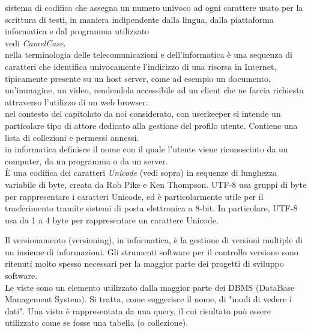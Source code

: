 \documentclass{scalatekids-article}
\begin{document}
    sistema di codifica che assegna un numero univoco ad ogni carattere usato per la scrittura di testi, in maniera indipendente dalla lingua, dalla piattaforma informatica e dal programma utilizzato
   \\

   vedi \textit{CamelCase}.
  \\

   nella terminologia delle telecomunicazioni e dell'informatica è una sequenza di caratteri che identifica univocamente l'indirizzo di una risorsa in Internet, tipicamente presente su un host server, come ad esempio un documento, un'immagine, un video, rendendola accessibile ad un client che ne faccia richiesta attraverso l'utilizzo di un web browser.
  \\

   nel contesto del capitolato da noi considerato, con userkeeper si intende un particolare tipo di attore dedicato alla gestione del profilo utente. Contiene una lista di collezioni e permessi annessi.
  \\
  
   in informatica definisce il nome con il quale l'utente viene riconosciuto da un computer, da un programma o da un server.
  \\

   È una codifica dei caratteri \textit{Unicode} (vedi sopra) in sequenze di lunghezza variabile di byte, creata da Rob Pike e Ken Thompson. UTF-8 usa gruppi di byte per rappresentare i caratteri Unicode, ed è particolarmente utile per il trasferimento tramite sistemi di posta elettronica a 8-bit.
  In particolare, UTF-8 usa da 1 a 4 byte per rappresentare un carattere Unicode.
  \\


   Il versionamento (versioning), in informatica, è la gestione di versioni multiple di un insieme di informazioni.
  Gli strumenti software per il controllo versione sono ritenuti molto spesso necessari per la maggior parte dei progetti di sviluppo software.
  \\
  
   Le viste sono un elemento utilizzato dalla maggior parte dei DBMS (DataBase Management System). Si tratta, come suggerisce il nome, di "modi di vedere i dati".
Una vista è rappresentata da una query, il cui risultato può essere utilizzato come se fosse una tabella (o collezione).
  \\
\end{document}

